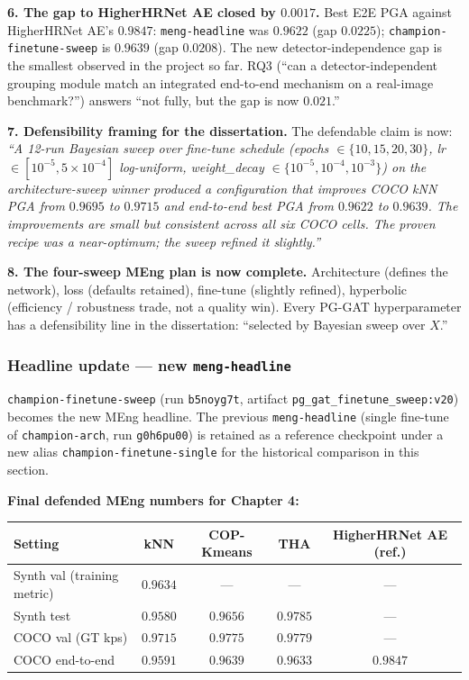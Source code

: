 \textbf{6. The gap to HigherHRNet AE closed by $0.0017$.} Best E2E PGA against HigherHRNet AE's $0.9847$: \texttt{meng-headline} was $0.9622$ (gap $0.0225$); \texttt{champion-finetune-sweep} is $0.9639$ (gap $0.0208$). The new detector-independence gap is the smallest observed in the project so far. RQ3 (``can a detector-independent grouping module match an integrated end-to-end mechanism on a real-image benchmark?'') answers ``not fully, but the gap is now $0.021$.''

\textbf{7. Defensibility framing for the dissertation.} The defendable claim is now: \emph{``A 12-run Bayesian sweep over fine-tune schedule (epochs $\in \{10, 15, 20, 30\}$, lr $\in [10^{-5}, 5\!\times\!10^{-4}]$ log-uniform, weight\_decay $\in \{10^{-5}, 10^{-4}, 10^{-3}\}$) on the architecture-sweep winner produced a configuration that improves COCO kNN PGA from $0.9695$ to $0.9715$ and end-to-end best PGA from $0.9622$ to $0.9639$. The improvements are small but consistent across all six COCO cells. The proven recipe was a near-optimum; the sweep refined it slightly.''}

\textbf{8. The four-sweep MEng plan is now complete.} Architecture (defines the network), loss (defaults retained), fine-tune (slightly refined), hyperbolic (efficiency / robustness trade, not a quality win). Every PG-GAT hyperparameter has a defensibility line in the dissertation: ``selected by Bayesian sweep over $X$.''

\subsubsection{Headline update --- new \texttt{meng-headline}}

\texttt{champion-finetune-sweep} (run \texttt{b5noyg7t}, artifact \texttt{pg\_gat\_finetune\_sweep:v20}) becomes the new MEng headline.
The previous \texttt{meng-headline} (single fine-tune of \texttt{champion-arch}, run \texttt{g0h6pu00}) is retained as a reference checkpoint under a new alias \texttt{champion-finetune-single} for the historical comparison in this section.

\textbf{Final defended MEng numbers for Chapter 4:}

\begin{tabular}{lcccc}
\hline
\textbf{Setting} & \textbf{kNN} & \textbf{COP-Kmeans} & \textbf{THA} & \textbf{HigherHRNet AE (ref.)} \\
\hline
Synth val (training metric) & $0.9634$ & --- & --- & --- \\
Synth test                  & $0.9580$ & $0.9656$ & $\mathbf{0.9785}$ & --- \\
COCO val (GT kps)           & $0.9715$ & $\mathbf{0.9775}$ & $0.9779$ & --- \\
COCO end-to-end             & $0.9591$ & $\mathbf{0.9639}$ & $0.9633$ & $0.9847$ \\
\hline
\end{tabular}


